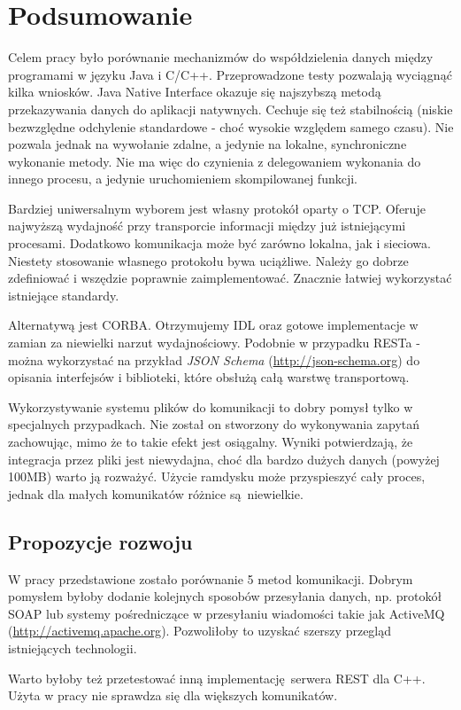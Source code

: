 \chapter{Podsumowanie}

Celem pracy było porównanie mechanizmów do współdzielenia danych między programami w języku Java i C/C++. Przeprowadzone testy pozwalają wyciągnąć kilka wniosków.
Java Native Interface okazuje się najszybszą metodą przekazywania danych do aplikacji natywnych. Cechuje się też stabilnością (niskie bezwzględne odchylenie standardowe - choć wysokie względem samego czasu). Nie pozwala jednak na wywołanie zdalne, a jedynie na lokalne, synchroniczne wykonanie metody. Nie ma więc do czynienia z delegowaniem wykonania do innego procesu, a jedynie uruchomieniem skompilowanej funkcji.

Bardziej uniwersalnym wyborem jest własny protokół oparty o TCP. Oferuje najwyższą wydajność przy transporcie informacji między już istniejącymi procesami. Dodatkowo komunikacja może być zarówno lokalna, jak i sieciowa. Niestety stosowanie własnego protokołu bywa uciążliwe. Należy go dobrze zdefiniować i wszędzie poprawnie zaimplementować. Znacznie łatwiej wykorzystać istniejące standardy.

Alternatywą jest CORBA. Otrzymujemy IDL oraz gotowe implementacje w zamian za niewielki narzut wydajnościowy. Podobnie w przypadku RESTa - można wykorzystać na przykład \textit{JSON Schema} (\url{http://json-schema.org}) do opisania interfejsów i biblioteki, które obsłużą całą warstwę transportową.

Wykorzystywanie systemu plików do komunikacji to dobry pomysł tylko w specjalnych przypadkach. Nie został on stworzony do wykonywania zapytań zachowując, mimo że to takie efekt jest osiągalny. Wyniki potwierdzają, że integracja przez pliki jest niewydajna, choć dla bardzo dużych danych (powyżej 100MB) warto ją rozważyć. Użycie ramdysku może przyspieszyć cały proces, jednak dla małych komunikatów różnice są niewielkie.


\section{Propozycje rozwoju}

W pracy przedstawione zostało porównanie 5 metod komunikacji. Dobrym pomysłem byłoby dodanie kolejnych sposobów przesyłania danych, np. protokół SOAP lub systemy pośredniczące w przesyłaniu wiadomości takie jak ActiveMQ (\url{http://activemq.apache.org}). Pozwoliłoby to uzyskać szerszy przegląd istniejących technologii.

Warto byłoby też przetestować inną implementację serwera REST dla C++. Użyta w pracy nie sprawdza się dla większych komunikatów.
